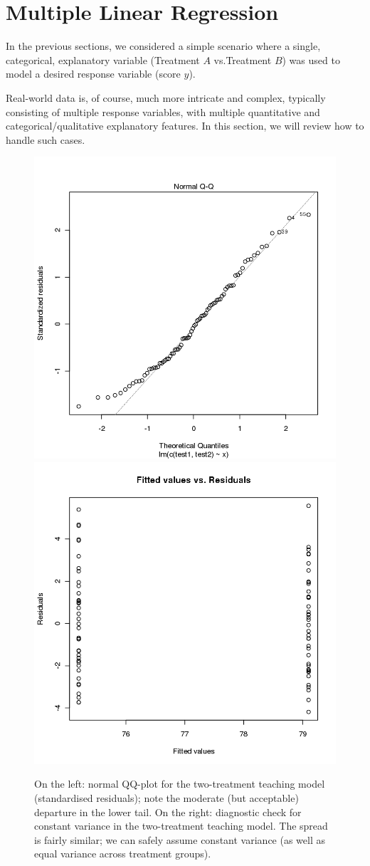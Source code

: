 
\section{Multiple Linear Regression}\label{sec:MLR}
In the previous sections, we considered a simple scenario where a single, categorical, explanatory variable (Treatment $A$ vs.\@ Treatment $B$) was used to model a desired response variable (score $y$). \par Real-world data is, of course, much more intricate and complex, typically consisting of multiple response variables, with multiple quantitative and categorical/qualitative explanatory features. \newl In this section, we will review how to handle such cases.
\begin{figure}[t]
\centering
  \includegraphics[width=0.475\linewidth]{Images/testA3.png} \quad  \includegraphics[width=0.475\linewidth]{Images/testA4.png}
  \caption{\small On the left: normal QQ-plot for the two-treatment teaching model (standardised residuals); note the moderate (but acceptable) departure in the lower tail. On the right: diagnostic check for constant variance in the two-treatment teaching model. The spread is fairly similar; we can safely assume constant variance (as well as equal variance across treatment groups).}
  \label{fig:testA3}
\end{figure}
